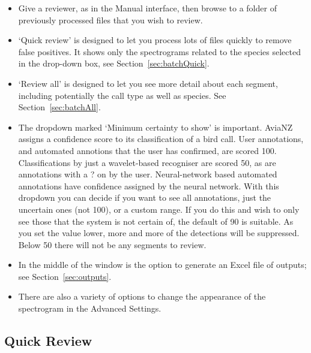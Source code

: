 \documentclass{article}
\begin{document}
\begin{itemize}
\item Give a reviewer, as in the Manual interface, then browse to a folder of previously processed files that you wish to review.
\item `Quick review' is designed to let you process lots of files quickly to remove false positives. It shows only the spectrograms related to the species selected in the drop-down box, see Section~\ref{sec:batchQuick}.
\item `Review all' is designed to let you see more detail about each segment, including potentially the call type as well as species. See Section~\ref{sec:batchAll}.
\item The dropdown marked `Minimum certainty to show' is important. AviaNZ assigns a confidence score to its classification of a bird call. User annotations, and automated annotions that the user has confirmed, are scored 100. Classifications by just a wavelet-based recogniser are scored 50, as are annotations with a ? on by the user. Neural-network based automated annotations have confidence assigned by the neural network. With this dropdown you can decide if you want to see all annotations, just the uncertain ones (not 100), or a custom range. If you do this and wish to only see those that the system is not certain of, the default of 90 is suitable. As you set the value lower, more and more of the detections will be suppressed. Below 50 there will not be any segments to review.
\item In the middle of the window is the option to generate an Excel file of outputs; see Section~\ref{sec:outputs}.
\item There are also a variety of options to change the appearance of the spectrogram in the Advanced Settings.
\end{itemize}

\subsection{Quick Review\label{sec:batchQuick}}
\end{document}
